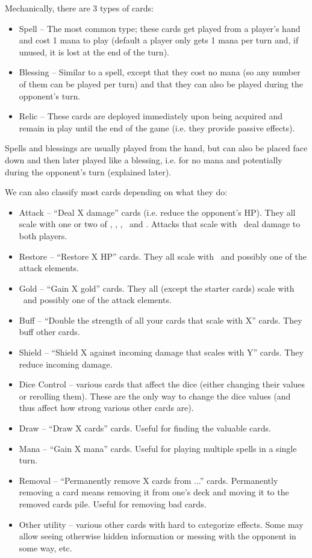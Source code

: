 \documentclass[dvipsnames,parskip,a4paper]{scrartcl}
\newcommand{\iconsize}{3.4mm}
\newcommand{\icondepth}{0.45mm}
\newcommand{\icon}[1]{\raisebox{-\icondepth}{\texttt{[image:  \#1 ]}}}
\newcommand{\fire}{\icon{icons/fire.png}}
\newcommand{\earth}{\icon{icons/earth.png}}
\newcommand{\water}{\icon{icons/water.png}}
\newcommand{\nature}{\icon{icons/nature.png}}
\newcommand{\magic}{\icon{icons/magic.png}}
\newcommand{\gold}{\icon{icons/gold.png}}
\newcommand{\chance}{\icon{icons/chance.png}}
\begin{document}
Mechanically, there are 3 types of cards:

\begin{itemize}
\item Spell -- The most common type; these cards get played from a player's hand and cost 1 mana to play (default a player only gets 1 mana per turn and, if unused, it is lost at the end of the turn).
\item Blessing -- Similar to a spell, except that they cost no mana (so any number of them can be played per turn) and that they can also be played during the opponent's turn.
\item Relic -- These cards are deployed immediately upon being acquired and remain in play until the end of the game (i.e. they provide passive effects).
\end{itemize}

Spells and blessings are usually played from the hand, but can also be placed face down and then later played like a blessing, i.e. for no mana and potentially during the opponent's turn (explained later).

\vspace{4pt}

We can also classify most cards depending on what they do:

\begin{itemize}
\item Attack -- ``Deal X damage'' cards (i.e. reduce the opponent's HP). They all scale with one or two of \fire, \earth, \water, \chance \ and \magic. Attacks that scale with \water \ deal damage to both players.
\item Restore -- ``Restore X HP'' cards. They all scale with \nature \ and possibly one of the attack elements.
\item Gold -- ``Gain X gold'' cards. They all (except the starter cards) scale with \gold \ and possibly one of the attack elements.
\item Buff -- ``Double the strength of all your cards that scale with X'' cards. They buff other cards.
\item Shield -- ``Shield X against incoming damage that scales with Y'' cards. They reduce incoming damage.
\item Dice Control -- various cards that affect the dice (either changing their values or rerolling them). These are the only way to change the dice values (and thus affect how strong various other cards are).
\item Draw -- ``Draw X cards'' cards. Useful for finding the valuable cards.
\item Mana -- ``Gain X mana'' cards. Useful for playing multiple spells in a single turn.
\item Removal -- ``Permanently remove X cards from ...'' cards. Permanently removing a card means removing it from one's deck and moving it to the removed cards pile. Useful for removing bad cards.
\item Other utility -- various other cards with hard to categorize effects. Some may allow seeing otherwise hidden information or messing with the opponent in some way, etc.
\end{itemize}
\end{document}
